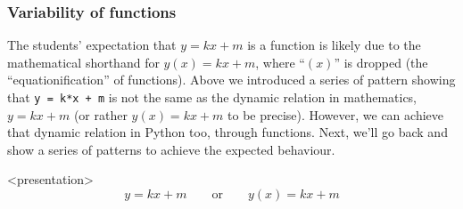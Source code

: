 
\subsubsection{Variability of functions}

The students' expectation that \(y = kx + m\) is a function 
\autocite{Kohn2017VariableEvaluation,Plass2015Variables,Doukakis2007} is 
likely due to the mathematical shorthand for \(y(x) = kx + m\), where 
\enquote{\((x)\)} is dropped (the \enquote{equationification} of functions).
Above we introduced a series of pattern showing that
\texttt{y = k*x + m}
is not the same as the dynamic relation in mathematics,
\(y = kx + m\) (or rather \(y(x) = kx + m\) to be precise).
However, we can achieve that dynamic relation in Python too, through functions.
Next, we'll go back and show a series of patterns to achieve the expected 
behaviour.

\begin{frame}<presentation>
  \[
    y = kx + m
    \qquad
    \text{or}
    \qquad
    y(x) = kx + m
  \]
\end{frame}


